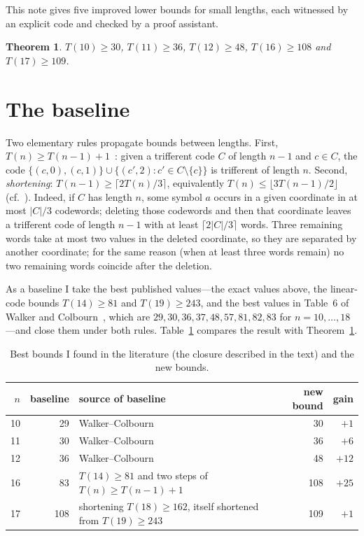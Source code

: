 \documentclass[11pt]{article}
\newtheorem{theorem}{Theorem}
\theoremstyle{remark}
\begin{document}
This note gives five improved lower bounds for small lengths, each witnessed by an explicit code and checked by a proof assistant.

\begin{theorem}\label{thm:main}
$T(10)\ge 30$, $T(11)\ge 36$, $T(12)\ge 48$, $T(16)\ge 108$ and $T(17)\ge 109$.
\end{theorem}

\section{The baseline}

Two elementary rules propagate bounds between lengths.
First, $T(n)\ge T(n-1)+1$~\cite[Lemma~1 and Corollary~2]{kurz2024}: given a trifferent code $C$ of length $n-1$ and $c\in C$, the code $\{(c,0),(c,1)\}\cup\{(c',2):c'\in C\setminus\{c\}\}$ is trifferent of length $n$.
Second, \emph{shortening}: $T(n-1)\ge\lceil 2T(n)/3\rceil$, equivalently $T(n)\le\lfloor 3T(n-1)/2\rfloor$ (cf.~\cite{kurz2024}).
Indeed, if $C$ has length $n$, some symbol $a$ occurs in a given coordinate in at most $|C|/3$ codewords; deleting those codewords and then that coordinate leaves a trifferent code of length $n-1$ with at least $\lceil 2|C|/3\rceil$ words. Three remaining words take at most two values in the deleted coordinate, so they are separated by another coordinate; for the same reason (when at least three words remain) no two remaining words coincide after the deletion.

As a baseline I take the best published values---the exact values above, the linear-code bounds $T(14)\ge 81$ and $T(19)\ge 243$, and the best values in Table~6 of Walker and Colbourn~\cite{walker2007}, which are $29,30,36,37,48,57,81,82,83$ for $n=10,\dots,18$---and close them under both rules.
Table~\ref{tab:bounds} compares the result with Theorem~\ref{thm:main}.

\begin{table}[ht]
\centering
\begin{tabular}{rrlrr}
\toprule
$n$ & baseline & source of baseline & new bound & gain \\
\midrule
10 & 29 & Walker--Colbourn~\cite{walker2007} & 30 & $+1$\\
11 & 30 & Walker--Colbourn~\cite{walker2007} & 36 & $+6$\\
12 & 36 & Walker--Colbourn~\cite{walker2007} & 48 & $+12$\\
16 & 83 & $T(14)\ge 81$ and two steps of $T(n)\ge T(n-1)+1$ & 108 & $+25$\\
17 & 108 & shortening $T(18)\ge 162$, itself shortened from $T(19)\ge 243$ & 109 & $+1$\\
\bottomrule
\end{tabular}
\caption{Best bounds I found in the literature (the closure described in the text) and the new bounds.}
\label{tab:bounds}
\end{table}
\end{document}
